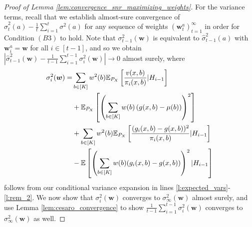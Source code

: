 \documentclass{article}
\begin{document}
\begin{appendices}
\begin{proof}[Proof of Lemma \ref{lem:convergence_snr_maximizing_weights}]
For the variance terms, recall that we establish almost-sure convergence of $\hat\sigma^2_{t}(a) - \frac{1}{t}\sum_{i=1}^t \sigma^2(a)$ for any sequence of weights $(\bm{w}_t^a)_{t=1}^\infty$ in order for  Condition $(B3)$ to hold. Note that $\sigma^2_{t-1}(\bm{w})$ is equivalent to $\hat\sigma^2_{t-1}(a)$ with $\bm{w}_i^a = \bm{w}$ for all $i \in [t-1]$, and so we obtain $|\hat\sigma_{t-1}^2(\bm{w}) - \frac{1}{t-1}\sum_{i=1}^{t-1} \sigma_{i}^2(\bm{w})| \rightarrow 0$ almost surely, where
\begin{align}
 \sigma_{i}^2(\boldsymbol{w}) =& \sum_{b \in [K]}w^2(b) \mathbb{E}_{P_X}\left[\frac{v(x,b)}{\pi_i(x,b)} | H_{i-1}\right]\label{l:prob_1}  \\
 &+\mathbb{E}_{P_X}\left[\left(\sum_{b \in [K]}w(b) \left(g(x,b) - \mu(b)\right) \right)^2 \right] \\
 &+ \sum_{b \in [K]} w^2(b) \mathbb{E}_{P_X}\left[ \frac{(g_i(x,b) - g(x,b))^2}{\pi_i(x,b)} | H_{i-1} \right]\label{l:prob_2} \\
 &- \mathbb{E}\left[\left( \sum_{b \in [K]}w(b) (g_i(x,b) -g(x,b)) \right)^2 | H_{i-1}\right]\label{l:prob_3}
\end{align}
follows from  our conditional variance expansion in lines \eqref{l:expected_vars}-\eqref{l:rem_2}. We now show that $\sigma_i^2(\bm{w})$ converges to $\sigma_\infty^2(\bm{w})$ almost surely, and use Lemma \ref{lem:cesaro_convergence} to show $\frac{1}{t-1}\sum_{i=1}^{t-1} \sigma_{i}^2(\bm{w})$ converges to $\sigma_\infty^2(\bm{w})$ as well. 


\end{proof}
\end{appendices}
\end{document}
